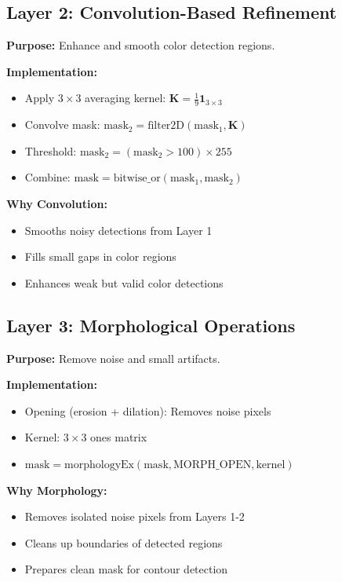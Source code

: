 \documentclass[11pt]{article}
\begin{document}
\subsection{Layer 2: Convolution-Based Refinement}

\textbf{Purpose:} Enhance and smooth color detection regions.

\textbf{Implementation:}
\begin{itemize}
    \item Apply $3 \times 3$ averaging kernel: $\mathbf{K} = \frac{1}{9}\mathbf{1}_{3 \times 3}$
    \item Convolve mask: $\text{mask}_2 = \text{filter2D}(\text{mask}_1, \mathbf{K})$
    \item Threshold: $\text{mask}_2 = (\text{mask}_2 > 100) \times 255$
    \item Combine: $\text{mask} = \text{bitwise\_or}(\text{mask}_1, \text{mask}_2)$
\end{itemize}

\textbf{Why Convolution:}
\begin{itemize}
    \item Smooths noisy detections from Layer 1
    \item Fills small gaps in color regions
    \item Enhances weak but valid color detections
\end{itemize}

\subsection{Layer 3: Morphological Operations}

\textbf{Purpose:} Remove noise and small artifacts.

\textbf{Implementation:}
\begin{itemize}
    \item Opening (erosion + dilation): Removes noise pixels
    \item Kernel: $3 \times 3$ ones matrix
    \item $\text{mask} = \text{morphologyEx}(\text{mask}, \text{MORPH\_OPEN}, \text{kernel})$
\end{itemize}

\textbf{Why Morphology:}
\begin{itemize}
    \item Removes isolated noise pixels from Layers 1-2
    \item Cleans up boundaries of detected regions
    \item Prepares clean mask for contour detection
\end{itemize}
\end{document}

